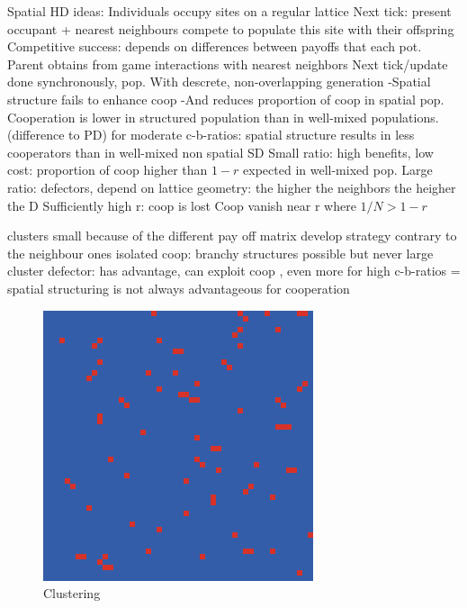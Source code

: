 \documentclass[DIV=calc, paper=a4, fontsize=11pt, twocolumn]{scrartcl}	 %
\begin{document}
Spatial HD ideas: 
	Individuals occupy sites on a regular lattice
	Next tick: present occupant + nearest neighbours compete to populate this site with their offspring
	Competitive success: depends on differences between payoffs that each pot. Parent obtains from game interactions with nearest neighbors
	Next tick/update done synchronously, pop. With descrete, non-overlapping generation
	-Spatial structure fails to enhance coop
 	-And reduces proportion of coop in spatial pop.
 	Cooperation is lower in structured population than in well-mixed populations. (difference to PD) 
for moderate c-b-ratios: spatial structure results in less cooperators than in well-mixed non spatial SD  
Small ratio: high benefits, low cost: proportion of coop higher than $1-r$ expected in well-mixed pop.
Large ratio: defectors, depend on lattice geometry: the higher the neighbors the heigher the D
Sufficiently high r: coop is lost 
Coop vanish near r where $ 1/N > 1- r$

clusters small because of the different pay off matrix
develop  strategy contrary to the neighbour ones 
isolated coop: branchy structures possible but never large cluster 
defector: has advantage, can exploit coop , even more for high c-b-ratios
= spatial structuring is not always advantageous for cooperation


\begin{figure}[here]
\centering
\begin{minipage}{.35\textwidth}
  \centering
  \includegraphics[width=1\linewidth]{HDspatial8cost01}
 \caption{Clustering}
\label{fig:PDspatialcluster}
\end{minipage}%
\end{figure}
\end{document}
